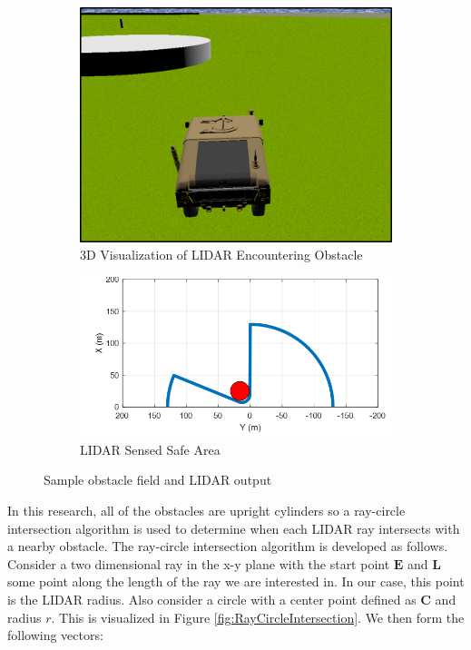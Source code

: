 \documentclass[12pt,onecolumn]{report}
\begin{document}
\begin{figure}[t]
	\centering
	\begin{subfigure}[t]{0.45\textwidth}
		\centering
		\includegraphics[width=\columnwidth]{Figs/incomingObst.png}
		\caption{{\small 3D Visualization of LIDAR Encountering Obstacle}}   
		\label{fig:obstacle_field_3D}
	\end{subfigure}
	\hfill
	\begin{subfigure}[t]{0.45\textwidth}
		\centering
		\includegraphics[width=\columnwidth]{Figs/obstLIDAR.png}
		\caption{\small LIDAR Sensed Safe Area}   
		\label{fig:obstacle_field_LIDAR}
	\end{subfigure}
	\caption{\small Sample obstacle field and LIDAR output}
	\label{fig:LIDARExample}
\end{figure}

In this research, all of the obstacles are upright cylinders so a ray-circle intersection algorithm is used to determine when each LIDAR ray intersects with a nearby obstacle. The ray-circle intersection algorithm is developed as follows. Consider a two dimensional ray in the x-y plane with the start point $\boldsymbol{E}$ and $\boldsymbol{L}$ some point along the length of the ray we are interested in. In our case, this point is the LIDAR radius. Also consider a circle with a center point defined as $\boldsymbol{C}$ and radius $r$. This is visualized in Figure \ref{fig:RayCircleIntersection}. We then form the following vectors:
\end{document}
